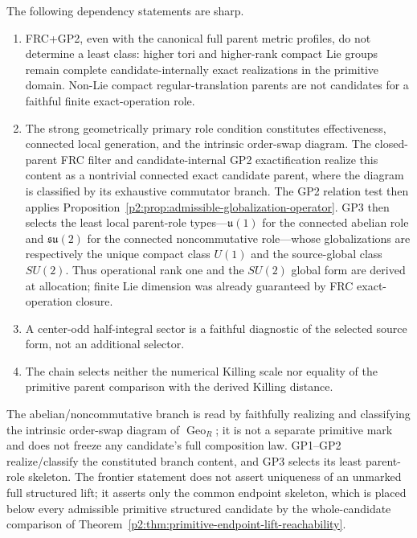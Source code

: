 \documentclass[11pt,a4paper]{article}
\begin{document}
\begin{theorem}
\label{p2:thm:gp-independence-frontier}
The following dependency statements are sharp.
\begin{enumerate}[label=(\roman*), leftmargin=2em]
\item FRC+GP2, even with the canonical full parent metric profiles, do not
determine a least class: higher tori and higher-rank compact Lie groups remain
complete candidate-internally exact realizations in the primitive domain.
Non-Lie compact regular-translation parents are not candidates
for a faithful finite exact-operation role.
\item The strong geometrically primary role condition constitutes effectiveness,
connected local generation, and the intrinsic order-swap diagram.  The
closed-parent FRC filter and candidate-internal GP2 exactification realize this
content as a nontrivial connected exact candidate parent, where the diagram is
classified by its exhaustive commutator branch.  The GP2 relation test then applies
Proposition~\ref{p2:prop:admissible-globalization-operator}.  GP3 then selects
the least local parent-role types---\(\mathfrak u(1)\) for the connected
abelian role and \(\mathfrak{su}(2)\) for the connected noncommutative
role---whose
globalizations are respectively the unique compact class \(U(1)\) and the
source-global class \(SU(2)\).  Thus
operational rank one and the \(SU(2)\) global form are derived at allocation;
finite Lie dimension was already guaranteed by FRC exact-operation closure.
\item A center-odd half-integral sector is a faithful diagnostic of the
selected source form, not an additional selector.
\item The chain selects neither the numerical Killing scale nor equality of
the primitive parent comparison with the derived Killing distance.
\end{enumerate}
The abelian/noncommutative branch is read by faithfully realizing and
classifying the intrinsic
order-swap diagram of \(\operatorname{Geo}_R\); it is not a separate primitive
mark and does not freeze any candidate's full composition law.  GP1--GP2
realize/classify the constituted branch content, and GP3 selects its least
parent-role skeleton.
The frontier statement does not assert uniqueness of an unmarked full
structured lift; it asserts only the common endpoint skeleton, which is placed
below every admissible primitive structured candidate by the whole-candidate
comparison of
Theorem~\ref{p2:thm:primitive-endpoint-lift-reachability}.
\end{theorem}
\end{document}
